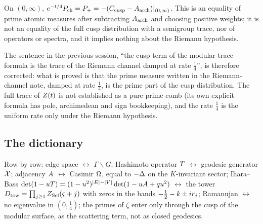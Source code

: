 \begin{proposition}
\label{prop:damping-identity}
On $(0,\infty)$, $e^{-t/4}P_{\mathrm{ch}} = P_{+} = -(C_{\mathrm{cusp}}-A_{\mathrm{arch}})|_{(0,\infty)}$.
This is an equality of prime atomic measures after subtracting $A_{\mathrm{arch}}$ and
choosing positive weights; it is not an equality of the full cusp
distribution with a semigroup trace, nor of operators or spectra, and it
implies nothing about the Riemann hypothesis.
\end{proposition}

The sentence in the previous session, ``the cusp term of the modular trace
formula is the trace of the Riemann channel damped at rate $\tfrac14$'', is
therefore corrected: what is proved is that the prime measure written in the
Riemann-channel note, damped at rate $\tfrac14$, is the prime part of the cusp
distribution. The full trace of $Z(t)$ is not established as a pure prime comb
(its own explicit formula has pole, archimedean and sign bookkeeping), and
the rate $\tfrac14$ is the uniform rate only under the Riemann hypothesis.

\subsection{The dictionary}

\begin{observation}
\label{obs:continuous-dictionary}
Row by row: edge space $\leftrightarrow$ $\Gamma\backslash G$; Hashimoto
operator $T$ $\leftrightarrow$ geodesic generator $\mathcal X$; adjacency
$A$ $\leftrightarrow$ Casimir $\Omega$, equal to $-\Delta$ on the
$K$-invariant sector; Ihara--Bass $\det(1-uT) = (1-u^2)^{|E|-|V|}
\det(1-uA+qu^2)$ $\leftrightarrow$ the tower
$D_{\mathrm{tow}} = \prod_{j\ge1}Z_{\mathrm{Sel}}(\varsigma+j)$ with zeros in the bands
$-\tfrac12-k\pm ir_{j}$; Ramanujan $\leftrightarrow$ no eigenvalue in
$(0,\tfrac14)$; the primes of $\zeta$ enter only through the cusp of the
modular surface, as the scattering term, not as closed geodesics.
\end{observation}

